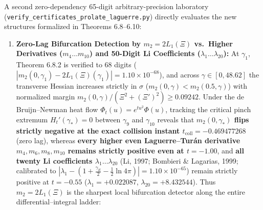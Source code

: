 \documentclass[
  11pt,
]{article}
\begin{document}
A second zero-dependency 65-digit arbitrary-precision laboratory
(\texttt{verify\_certificates\_prolate\_laguerre.py}) directly evaluates
the new structures formalized in Theorems 6.8--6.10:

\begin{enumerate}
\def\labelenumi{\arabic{enumi}.}
\item
  \textbf{Zero-Lag Bifurcation Detection by \(m_2 = 2L_1(\Xi)\)
  vs.~Higher Derivatives (\(m_4 \dots m_{10}\)) and 50-Digit Li
  Coefficients (\(\lambda_1 \dots \lambda_{20}\)):} At \(\gamma_1\),
  Theorem 6.8.2 is verified to 68 digits
  (\(|m_2(0, \gamma_1) - 2L_1(\Xi)(\gamma_1)| = 1.10 \times 10^{-68}\)),
  and across \(\gamma \in [0, 48.62]\) the transverse Hessian increases
  strictly in \(\sigma\) (\(m_2(0, \gamma) < m_2(0.5, \gamma)\)) with
  normalized margin \(m_2(0, \gamma)/(\Xi^2 + (\Xi')^2) \ge 0.09242\).
  Under the de Bruijn--Newman heat flow \(\Phi_t(u) = e^{tu^2}\Phi(u)\),
  tracking the critical pinch extremum \(H_t'(\gamma_*) = 0\) between
  \(\gamma_9\) and \(\gamma_{10}\) reveals that
  \textbf{\(m_2(0, \gamma_*)\) flips strictly negative at the exact
  collision instant \(t_{\text{coll}} = -0.469477268\)} (zero lag),
  whereas \textbf{every higher even Laguerre--Turán derivative
  \(m_4, m_6, m_8, m_{10}\) remains strictly positive even at
  \(t = -1.00\)}, and \textbf{all twenty Li coefficients
  \(\lambda_1 \dots \lambda_{20}\)} (Li, 1997; Bombieri \& Lagarias,
  1999; calibrated to
  \(|\lambda_1 - (1 + \frac{\gamma_E}{2} - \frac{1}{2}\ln 4\pi)| = 1.10 \times 10^{-65}\))
  remain strictly positive at \(t = -0.55\) (\(\lambda_1 = +0.022087\),
  \(\lambda_{20} = +8.432544\)). Thus \(m_2 = 2L_1(\Xi)\) is the
  sharpest local bifurcation detector along the entire
  differential--integral ladder:


\end{enumerate}
\end{document}

